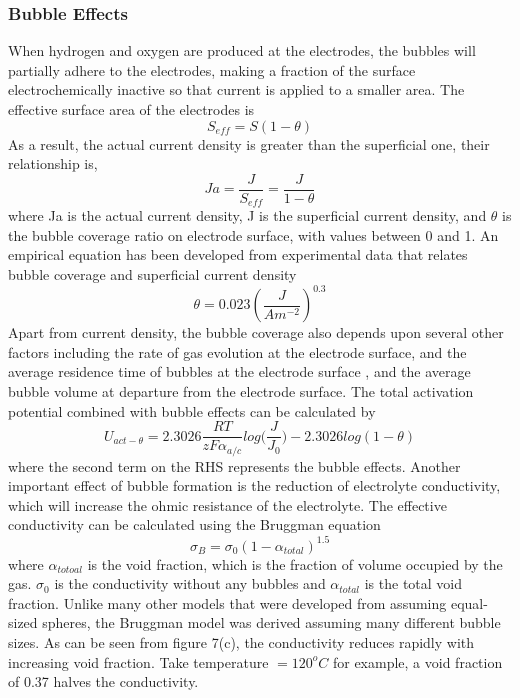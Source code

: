 \subsubsection{Bubble Effects}
When hydrogen and oxygen are produced at the electrodes, the bubbles will partially adhere to the electrodes, making a fraction of the surface electrochemically inactive so that current is applied to a smaller area. The effective surface area of the electrodes is
\begin{equation} 
S_{eff} = S(1-\theta)
\end{equation}
As a result, the actual current density is greater than the superficial one, their relationship is,
\begin{equation} 
Ja = \frac{J}{S_{eff}} = \frac{J}{1-\theta}
\end{equation} 
where Ja is the actual current density, J is the superficial current density, and $\theta$ is the bubble coverage ratio on electrode surface, with values between 0 and 1. An empirical equation has been developed from experimental data that relates bubble coverage and superficial current density \cite{bubble2} 
\begin{equation}
\theta = 0.023(\frac{J}{Am^{-2}})^{0.3}
\end{equation} 
Apart from current density, the bubble coverage also depends upon several other factors including the rate of gas evolution at the electrode surface, and the average residence time of bubbles at the electrode surface , and the average bubble volume at departure from the electrode surface.\cite{bubble2} The total activation potential combined with bubble effects can be calculated by\cite{activation4} 
\begin{equation} 
U_{act-\theta} = 2.3026\frac{RT}{zF\alpha_{a/c}}{log(\frac{J}{J_0}}) - 2.3026log(1-\theta) 
\end{equation} 
where the second term on the RHS represents the bubble effects. Another important effect of bubble formation is  the reduction of electrolyte conductivity, which will increase the ohmic resistance of the electrolyte. The effective conductivity  can be calculated using the Bruggman equation\cite{void} 
\begin{equation}
\sigma_B = \sigma_0(1- \alpha_{total})^{1.5}
\end{equation}
where $\alpha_{totoal}$ is the void fraction, which is the fraction of volume occupied by the gas. $\sigma_0$ is the conductivity without any bubbles and $\alpha_{total}$ is the total void fraction. Unlike many other models  that were developed from assuming equal-sized spheres, the Bruggman model was derived assuming many different bubble sizes.  As can be seen from figure 7(c), the conductivity reduces rapidly with increasing void fraction. Take temperature $= 120^oC$ for example, a void fraction of 0.37 halves the conductivity. %
